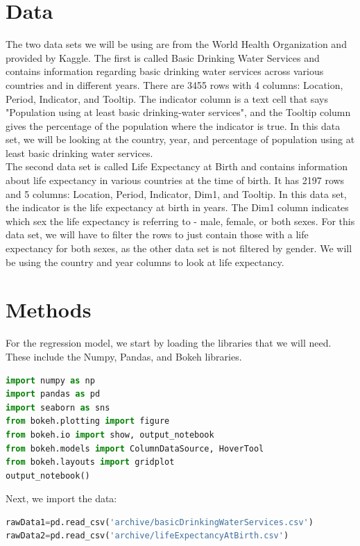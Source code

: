 \documentclass[12pt]{article}
\begin{document}
\section{Data}

\noindent
The two data sets we will be using are from the World Health Organization and provided by Kaggle. The first is called Basic Drinking Water Services and contains information regarding basic drinking water services across various countries and in different years. There are 3455 rows with 4 columns: Location, Period, Indicator, and Tooltip. The indicator column is a text cell that says "Population using at least basic drinking-water services", and the Tooltip column gives the percentage of the population where the indicator is true. In this data set, we will be looking at the country, year, and percentage of population using at least basic drinking water services. \\
  
\noindent
The second data set is called Life Expectancy at Birth and contains information about life expectancy in various countries at the time of birth. It has 2197 rows and 5 columns: Location, Period, Indicator, Dim1, and Tooltip. In this data set, the indicator is the life expectancy at birth in years. The Dim1 column indicates which sex the life expectancy is referring to - male, female, or both sexes. For this data set, we will have to filter the rows to just contain those with a life expectancy for both sexes, as the other data set is not filtered by gender. We will be using the country and year columns to look at life expectancy.


\section{Methods}

\noindent
For the regression model, we start by loading the libraries that we will need. These include the Numpy, Pandas, and Bokeh libraries.

\begin{lstlisting}[language=Python]
import numpy as np
import pandas as pd
import seaborn as sns
from bokeh.plotting import figure
from bokeh.io import show, output_notebook
from bokeh.models import ColumnDataSource, HoverTool
from bokeh.layouts import gridplot
output_notebook()
\end{lstlisting}

\noindent
Next, we import the data:
\begin{lstlisting}[language=Python]
rawData1=pd.read_csv('archive/basicDrinkingWaterServices.csv')
rawData2=pd.read_csv('archive/lifeExpectancyAtBirth.csv')
\end{lstlisting}
\end{document}
